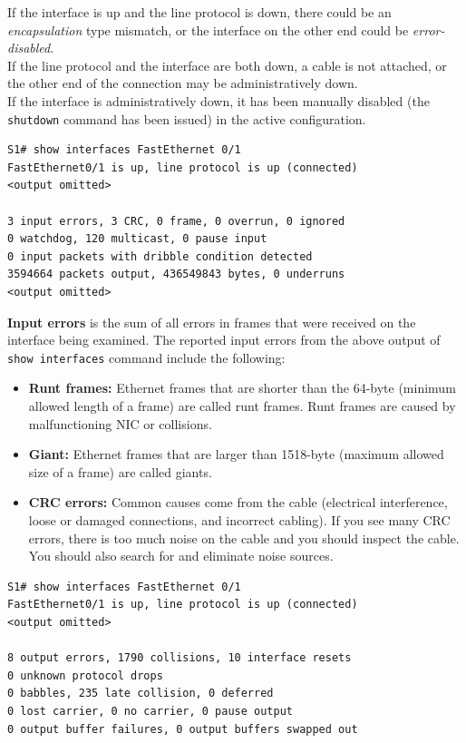 If the interface is up and the line protocol is down, there could be an \emph{encapsulation} type mismatch, or the interface on the other end could be \emph{error-disabled}.\\

If the line protocol and the interface are both down, a cable is not attached, or the other end of the connection may be administratively down.\\

If the interface is administratively down, it has been manually disabled (the \verb|shutdown| command has been issued) in the active configuration.\\

\begin{verbatim}
S1# show interfaces FastEthernet 0/1
FastEthernet0/1 is up, line protocol is up (connected)
<output omitted>

3 input errors, 3 CRC, 0 frame, 0 overrun, 0 ignored
0 watchdog, 120 multicast, 0 pause input
0 input packets with dribble condition detected
3594664 packets output, 436549843 bytes, 0 underruns
<output omitted>
\end{verbatim}

\textbf{Input errors} is the sum of all errors in frames that were received on the interface being examined. The reported input errors from the above output of \verb|show interfaces| command include the following:

\begin{itemize}
\item \textbf{Runt frames:} Ethernet frames that are shorter than the 64-byte (minimum allowed length of a frame) are called runt frames. Runt frames are caused by malfunctioning NIC or collisions.

\item \textbf{Giant:} Ethernet frames that are larger than 1518-byte (maximum allowed size of a frame) are called giants.

\item \textbf{CRC errors:} Common causes come from the cable (electrical interference, loose or damaged connections, and incorrect cabling). If you see many CRC errors, there is too much noise on the cable and you should inspect the cable. You should also search for and eliminate noise sources.
\end{itemize}

\begin{verbatim}
S1# show interfaces FastEthernet 0/1
FastEthernet0/1 is up, line protocol is up (connected)
<output omitted>

8 output errors, 1790 collisions, 10 interface resets
0 unknown protocol drops
0 babbles, 235 late collision, 0 deferred
0 lost carrier, 0 no carrier, 0 pause output
0 output buffer failures, 0 output buffers swapped out
\end{verbatim}


